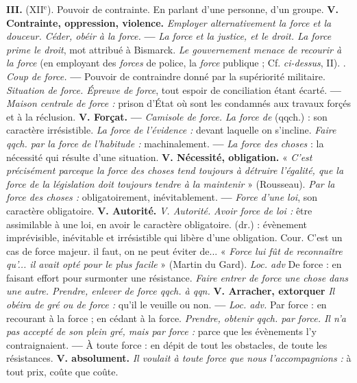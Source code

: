 {\bf III.} ({\footnotesize XII}$^\text{e}$). Pouvoir de contrainte.  En parlant d'une personne, d'un groupe. {\bf V. Contrainte, oppression, violence.} {\it Employer alternativement la force et la douceur. Céder, obéir à la force.} {\bf —} {\it La force et la justice, et le droit. La force prime le droit}, mot attribué à Bismarck. {\it Le gouvernement menace de recourir à la force} (en employant des {\it forces} de police, la {\it force} publique ; Cf. {\it ci-dessus}, II). . {\it Coup de force.} {\bf —} Pouvoir de contraindre donné par la supériorité militaire. {\it Situation de force. Épreuve de force}, tout espoir de conciliation étant écarté. {\bf —} {\it Maison centrale de force :} prison d'État où sont les condamnés aux travaux forçés et à la réclusion. {\bf V. Forçat.} {\bf —} {\it Camisole de force.}  {\it La force de} (qqch.) : son caractère irrésistible. {\it La force de l'évidence :} devant laquelle on s'incline. {\it Faire qqch. par la force de l'habitude :} machinalement. {\bf —} {\it La force des choses} : la nécessité qui résulte d'une situation. {\bf V. Nécessité, obligation.} « {\it C'est précisément parceque la force des choses tend toujours à détruire l'égalité, que la force de la législation doit toujours tendre à la maintenir} » ({\sc Rousseau}). {\it Par la force des choses :} obligatoirement, inévitablement. {\bf —} {\it Force d'une loi}, son caractère obligatoire. {\bf V. Autorité.} {\it V. Autorité.} {\it Avoir force de loi :} être assimilable à une loi, en avoir le caractère obligatoire.  (dr.) : évènement imprévisible, inévitable et irrésistible qui libère d'une obligation. Cour. C'est un cas de force majeur.  il faut, on ne peut éviter de... « {\it Force lui fût de reconnaître qu'... il avait opté pour le plus facile} » ({\sc Martin du Gard}).  {\it Loc. adv} {\sc De force} : en faisant effort pour surmonter une résistance. {\it Faire entrer de force une chose dans une autre. Prendre, enlever de force qqch. à qqn.} {\bf V. Arracher, extorquer} {\it Il obéira de gré ou de force :} qu'il le veuille ou non. {\bf —} {\it Loc. adv.} {\sc Par force} : en recourant à la force ; en cédant à la force. {\it Prendre, obtenir qqch. par force. Il n'a pas accepté de son plein gré, mais par force :} parce que les évènements l'y contraignaient. {\bf —} {\sc À toute force} : en dépit de tout les obstacles, de toute les résistances. {\bf V. absolument.} {\it Il voulait à toute force que nous l'accompagnions :} à tout prix, coûte que coûte.

